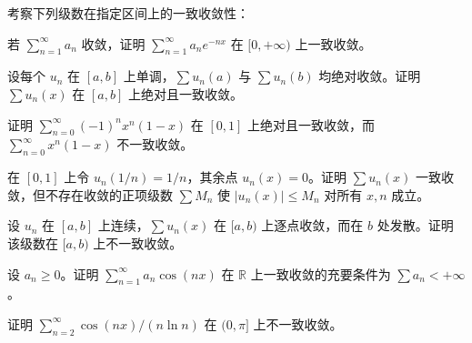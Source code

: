 \newpage
\noindent\begin{minipage}{\textwidth}
考察下列级数在指定区间上的一致收敛性：
\end{minipage}\par\vfill
\noindent\begin{minipage}{\textwidth}
若 $\sum_{n=1}^{\infty}a_n$ 收敛，证明 $\sum_{n=1}^{\infty}a_ne^{-nx}$ 在 $[0,+\infty)$ 上一致收敛。
\end{minipage}\par\vfill
\noindent\begin{minipage}{\textwidth}
设每个 $u_n$ 在 $[a,b]$ 上单调，$\sum u_n(a)$ 与 $\sum u_n(b)$ 均绝对收敛。证明 $\sum u_n(x)$ 在 $[a,b]$ 上绝对且一致收敛。
\end{minipage}\par\vfill
\newpage
\noindent\begin{minipage}{\textwidth}
证明 $\sum_{n=0}^{\infty}(-1)^nx^n(1-x)$ 在 $[0,1]$ 上绝对且一致收敛，而 $\sum_{n=0}^{\infty}x^n(1-x)$ 不一致收敛。
\end{minipage}\par\vfill
\noindent\begin{minipage}{\textwidth}
在 $[0,1]$ 上令 $u_n(1/n)=1/n$，其余点 $u_n(x)=0$。证明 $\sum u_n(x)$ 一致收敛，但不存在收敛的正项级数 $\sum M_n$ 使 $|u_n(x)|\le M_n$ 对所有 $x,n$ 成立。
\end{minipage}\par\vfill
\noindent\begin{minipage}{\textwidth}
设 $u_n$ 在 $[a,b]$ 上连续，$\sum u_n(x)$ 在 $[a,b)$ 上逐点收敛，而在 $b$ 处发散。证明该级数在 $[a,b)$ 上不一致收敛。
\end{minipage}\par\vfill
\newpage
\noindent\begin{minipage}{\textwidth}
设 $a_n\ge0$。证明 $\sum_{n=1}^{\infty}a_n\cos(nx)$ 在 $\mathbb R$ 上一致收敛的充要条件为 $\sum a_n<+\infty$。
\end{minipage}\par\vfill
\noindent\begin{minipage}{\textwidth}
证明 $\sum_{n=2}^{\infty}\cos(nx)/(n\ln n)$ 在 $(0,\pi]$ 上不一致收敛。
\end{minipage}\par\vfill
